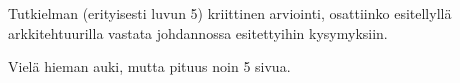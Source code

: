 Tutkielman (erityisesti luvun 5) kriittinen arviointi, osattiinko esitellyllä arkkitehtuurilla vastata johdannossa esitettyihin kysymyksiin.

Vielä hieman auki, mutta pituus noin 5 sivua.

